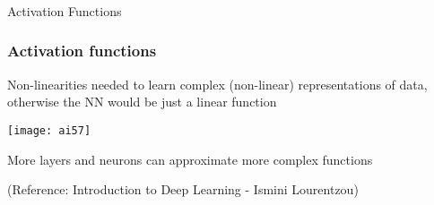 





\begin{frame}[fragile]\frametitle{}
\begin{center}
{\Large Activation Functions}
\end{center}
\end{frame}

\begin{frame}[fragile] \frametitle{Activation functions }
Non-linearities needed to learn complex (non-linear) representations of data, otherwise the NN would be just a linear function 

\begin{center}
\texttt{[image: ai57]}
\end{center}
More layers and neurons can approximate more complex functions

\tiny{(Reference: Introduction to Deep Learning - Ismini Lourentzou)}
\end{frame}


